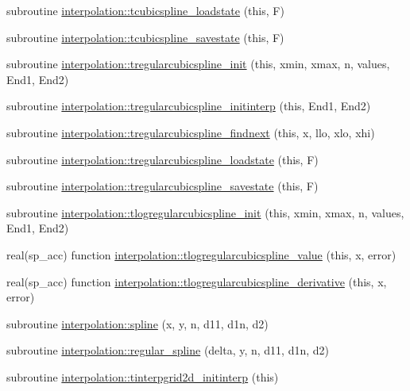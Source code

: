 \begin{DoxyCompactItemize}
\item 
subroutine \mbox{\hyperlink{namespaceinterpolation_abaeaf4f39b2dbd78b28a5e1802475739}{interpolation\+::tcubicspline\+\_\+loadstate}} (this, F)
\item 
subroutine \mbox{\hyperlink{namespaceinterpolation_a45a1312a778961c9e5f843e2602c83ac}{interpolation\+::tcubicspline\+\_\+savestate}} (this, F)
\item 
subroutine \mbox{\hyperlink{namespaceinterpolation_ad48c755482d305cc69ce002d8d57eb5e}{interpolation\+::tregularcubicspline\+\_\+init}} (this, xmin, xmax, n, values, End1, End2)
\item 
subroutine \mbox{\hyperlink{namespaceinterpolation_a771257f70f21fe027a53de95c8e6454d}{interpolation\+::tregularcubicspline\+\_\+initinterp}} (this, End1, End2)
\item 
subroutine \mbox{\hyperlink{namespaceinterpolation_a48194743476e43ec9aa03c02aab39655}{interpolation\+::tregularcubicspline\+\_\+findnext}} (this, x, llo, xlo, xhi)
\item 
subroutine \mbox{\hyperlink{namespaceinterpolation_a5fa8f1fc11b994b0bae323cbe4bd5512}{interpolation\+::tregularcubicspline\+\_\+loadstate}} (this, F)
\item 
subroutine \mbox{\hyperlink{namespaceinterpolation_a387cdc39d5949cc2aa2e5c6f483ea76c}{interpolation\+::tregularcubicspline\+\_\+savestate}} (this, F)
\item 
subroutine \mbox{\hyperlink{namespaceinterpolation_aa2be88d51742c20455f21df95d3cb51d}{interpolation\+::tlogregularcubicspline\+\_\+init}} (this, xmin, xmax, n, values, End1, End2)
\item 
real(sp\+\_\+acc) function \mbox{\hyperlink{namespaceinterpolation_a7268d0f57d8b03233c2f2b56ac6fdc52}{interpolation\+::tlogregularcubicspline\+\_\+value}} (this, x, error)
\item 
real(sp\+\_\+acc) function \mbox{\hyperlink{namespaceinterpolation_ac23315fe4c5bc33742774f63869508b4}{interpolation\+::tlogregularcubicspline\+\_\+derivative}} (this, x, error)
\item 
subroutine \mbox{\hyperlink{namespaceinterpolation_a5701eba38ba9b96476493a39580ebe38}{interpolation\+::spline}} (x, y, n, d11, d1n, d2)
\item 
subroutine \mbox{\hyperlink{namespaceinterpolation_a2864cd829f018329811e906e0b258b6c}{interpolation\+::regular\+\_\+spline}} (delta, y, n, d11, d1n, d2)
\item 
subroutine \mbox{\hyperlink{namespaceinterpolation_a7bde4bd21a717432ca0927ec3f2393ee}{interpolation\+::tinterpgrid2d\+\_\+initinterp}} (this)

\end{DoxyCompactItemize}
